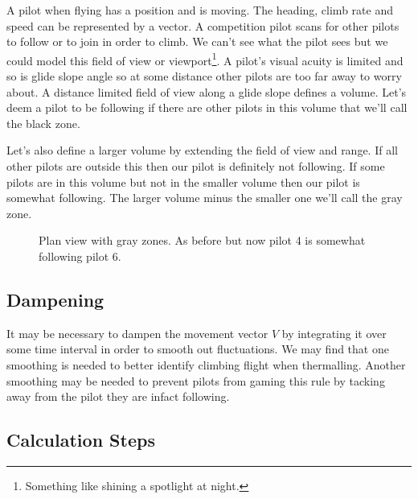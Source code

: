 \documentclass[gap.tex]{subfiles}
\begin{document}
A pilot when flying has a position and is moving. The heading, climb rate and
speed can be represented by a vector. A competition pilot scans for other
pilots to follow or to join in order to climb. We can't see what the pilot sees
but we could model this field of view or viewport\footnote{Something like
shining a spotlight at night.}. A pilot's visual acuity is limited and so is
glide slope angle so at some distance other pilots are too far away to worry
about. A distance limited field of view along a glide slope defines a volume.
Let's deem a pilot to be following if there are other pilots in this volume
that we'll call the black zone.

Let's also define a larger volume by extending the field of view and range. If
all other pilots are outside this then our pilot is definitely not following.
If some pilots are in this volume but not in the smaller volume then our pilot
is somewhat following. The larger volume minus the smaller one we'll call the
gray zone.

\begin{figure}[ht]
    \centering
    
    \caption{Plan view with gray zones. As before but now pilot 4 is somewhat following pilot 6.}
    \label{fig:view-port-zones}
\end{figure}

\subsection{Dampening}
It may be necessary to dampen the movement vector \(V\) by integrating it over
some time interval in order to smooth out fluctuations. We may find that one
smoothing is needed to better identify climbing flight when thermalling.
Another smoothing may be needed to prevent pilots from gaming this rule by
tacking away from the pilot they are infact following.

\subsection{Calculation Steps}
\end{document}
